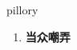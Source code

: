 
\begin{frame}
{\huge pillory}
\begin{center}
\begin{enumerate}\Large
  \item \textbf{当众嘲弄}
\end{enumerate}
\end{center}
\end{frame}

